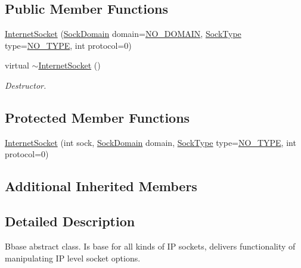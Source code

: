 \subsection*{Public Member Functions}
\begin{DoxyCompactItemize}
\item 
\hyperlink{classInternetSocket_afcbe1350ae9e2c4f256c986a371952ac}{Internet\+Socket} (\hyperlink{classSocketClass_ac940413abaa7328db8518a9f121babb6}{Sock\+Domain} domain=\hyperlink{classSocketClass_ac940413abaa7328db8518a9f121babb6aa9ec2a4d642c47813fe90f362603f1c4}{N\+O\+\_\+\+D\+O\+M\+A\+IN}, \hyperlink{classSocketClass_a2182dd9fee09459fabb99e6ae717f595}{Sock\+Type} type=\hyperlink{classSocketClass_a2182dd9fee09459fabb99e6ae717f595a8c7f955ea5b71498ff1d469345d813ad}{N\+O\+\_\+\+T\+Y\+PE}, int protocol=0)
\item 
virtual \hyperlink{classInternetSocket_aa05d862f91ae89c523f30c8af75e4bae}{$\sim$\+Internet\+Socket} ()
\begin{DoxyCompactList}\small\item\em Destructor. \end{DoxyCompactList}\end{DoxyCompactItemize}
\subsection*{Protected Member Functions}
\begin{DoxyCompactItemize}
\item 
\hyperlink{classInternetSocket_a1e7caaf50313a0f4d25ef9479c90b689}{Internet\+Socket} (int sock, \hyperlink{classSocketClass_ac940413abaa7328db8518a9f121babb6}{Sock\+Domain} domain, \hyperlink{classSocketClass_a2182dd9fee09459fabb99e6ae717f595}{Sock\+Type} type=\hyperlink{classSocketClass_a2182dd9fee09459fabb99e6ae717f595a8c7f955ea5b71498ff1d469345d813ad}{N\+O\+\_\+\+T\+Y\+PE}, int protocol=0)
\end{DoxyCompactItemize}
\subsection*{Additional Inherited Members}


\subsection{Detailed Description}
Bbase abstract class. Is base for all kinds of IP sockets, delivers functionality of manipulating IP level socket options. 

